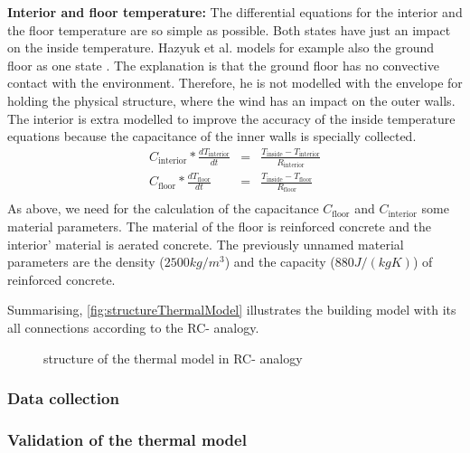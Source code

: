     \textbf{Interior and floor temperature:}\newline
    The differential equations for the interior and the floor temperature are so simple as possible. Both states have just an impact on the inside temperature. 
    Hazyuk et al. models for example also the ground floor as one state \cite{Hazyuk.2012}. The explanation is that the ground floor has no convective contact with the environment. Therefore, he is not modelled with the envelope for holding the physical structure, where the wind has an impact on the outer walls.
    The interior is extra modelled to improve the accuracy of the inside temperature equations because the capacitance of the inner walls is specially collected.
    \begin{align}
    C_\text{interior}*\frac{d T_\text{interior}}{d t} &=& \frac{T_\text{inside}-T_\text{interior}}{R_\text{interior}} \\
       C_\text{floor}*\frac{d T_\text{floor}}{d t} &=& \frac{T_\text{inside}-T_\text{floor}}{R_\text{floor}} \nonumber\\
    \end{align}
    As above, we need for the calculation of the capacitance $C_\text{floor}$ and $C_\text{interior}$ some material parameters. The material of the floor is reinforced concrete and the interior' material is aerated concrete. The previously unnamed material parameters are the density ($2500 kg/m^3$) \cite{AntonSchweizer.12.10.2021} and the capacity ($880 J/(kg K)$) \cite{AntonSchweizer.12.10.2021b} of reinforced concrete.\newline
     
    Summarising, \autoref{fig:structureThermalModel} illustrates the building model with its all connections according to the RC- analogy.
    \begin{figure}
            \centering
            \def\svgwidth{320pt}
            
            \caption{structure of the thermal model in RC- analogy}
            \label{fig:structureThermalModel}
        \end{figure}
        
    

    \subsubsection{Data collection}
    \label{datacollection}

    \subsubsection{Validation of the thermal model}
    \label{validationthermalmodel}

